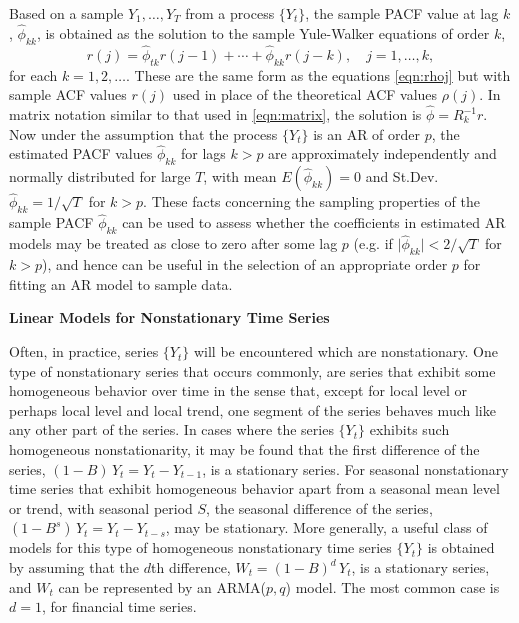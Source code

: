 Based on a sample $Y_1, \ldots, Y_T$ from a process $\{ Y_t \}$, the sample PACF value at lag $k$, $\hat{\phi}_{kk}$, is obtained as the solution to the sample Yule-Walker equations of order $k$,
	\begin{equation} \label{eqn:rjequation}
	r(j) = \hat{\phi}_{tk} r(j-1) + \cdots + \hat{\phi}_{kk} r(j-k), \quad j = 1, \ldots ,k,
	\end{equation}
for each $k= 1, 2, \ldots$. These are the same form as the equations \eqref{eqn:rhoj} but with sample ACF values $r(j)$ used in place of the theoretical ACF values $\rho(j)$. In matrix notation similar to that used in \eqref{eqn:matrix}, the solution is $\hat{\phi} = R_k^{-1} r$. Now under the assumption that the process $\{ Y_t \}$ is an AR of order $p$, the estimated PACF values $\hat{\phi}_{kk}$ for lags $k > p$ are approximately independently and normally distributed for large $T$, with mean $E(\hat{\phi}_{kk})= 0$ and St.Dev. $\hat{\phi}_{kk} = 1 / \sqrt{T}$ for $k > p$. These facts concerning the sampling properties of the sample PACF $\hat{\phi}_{kk}$ can be used to assess whether the coefficients in estimated AR models may be treated as close to zero after some lag $p$ (e.g. if $\lvert \hat{\phi}_{kk} \rvert < 2 / \sqrt{T}$ for $k > p$), and hence can be useful in the selection of an appropriate order $p$ for fitting an AR model to sample data. \twomedskip


\noindent\textbf{Linear Models for Nonstationary Time Series} \twomedskip


Often, in practice, series $\{ Y_t \}$ will be encountered which are nonstationary. One type of nonstationary series that occurs commonly, are series that exhibit some homogeneous behavior over time in the sense that, except for local level or perhaps local level and local trend, one segment of the series behaves much like any other part of the series. In cases where the series $\{ Y_t \}$ exhibits such homogeneous nonstationarity, it may be found that the first difference of the series, $(1 - B)\, Y_t = Y_t - Y_{t-1}$, is a stationary series. For seasonal nonstationary time series that exhibit homogeneous behavior apart from a seasonal mean level or trend, with seasonal period $S$, the seasonal difference of the series, $(1 - B^s)\, Y_t = Y_t - Y_{t-s}$, may be stationary. More generally, a useful class of models for this type of homogeneous nonstationary time series $\{Y_t\}$ is obtained by assuming that the $d$th difference, $W_t = (1 - B)^d\,Y_t$, is a stationary series, and $W_t$ can be represented by an ARMA($p,q$) model. The most common case is $d=1$, for financial time series. \twomedskip


